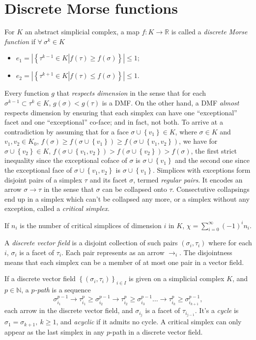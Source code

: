 \documentclass[a4paper,11pt, tikz]{article}
\newcommand{\lb}{\left(}
\newcommand{\rb}{\right)}
\newcommand{\lc}{\left\lbrace}
\newcommand{\rc}{\right\rbrace}
\newcommand{\lab}{\left|}
\newcommand{\rab}{\right|}
\renewcommand{\mid}{\left|\right.}
\newcommand{\reals}{\mathbb{R}}
\newcommand{\naturals}{\mathbb{N}}
\renewcommand{\t}{\tau}
\newcommand{\s}{\sigma}
\newcommand{\x}{\chi}
\newcommand{\tends}{\rightarrow}
\begin{document}
\section{Discrete Morse functions}
\noindent{}For $K$ an abstract simplicial complex, a map $f:K\tends \reals$ is called a \emph{discrete Morse function} if $\forall~\s^k\in K$
\begin{itemize}
  \item[(i)]$e_1=\lab\lc\t^{k-1}\in K\mid f\lb \tau\rb\geq f\lb \s\rb\rc\rab\leq 1$;
  \item[(ii)]$e_2=\lab\lc\t^{k+1}\in K\mid f\lb \tau\rb\leq f\lb \s\rb\rc\rab\leq 1$.
\end{itemize}
Every function $g$ that \emph{respects dimension} in the sense that for each $\s^{k-1}\subset \t^k\in K$, $g\lb \s\rb<g\lb \t\rb$ is a DMF. On the other hand, a DMF \emph{almost} respects dimension by ensuring that each simplex can have one ``exceptional'' facet and one ``exceptional'' co-face; and in fact, not both. To arrive at a contradiction by assuming that for a face $\s\cup\lc v_1\rc\in K$, where $\s\in K$ and $v_1,v_2\in K_0$, $f\lb \s\rb\geq f\lb \s\cup\lc v_1\rc\rb\geq f\lb \s\cup \lc v_1, v_2\rc\rb$, we have for $\s\cup\lc v_2\rc\in K$, $f\lb \s\cup \lc v_1, v_2\rc\rb>f\lb \s\cup \lc v_2\rc\rb>f\lb\s\rb$, the first strict inequality since the exceptional coface of $\s$ is $\s\cup\lc v_1\rc$ and the second one since the exceptional face of $\s\cup\lc v_1,v_2\rc$ is $\s\cup\lc v_1\rc$. Simplices with exceptions form disjoint pairs of a simplex $\t$ and its facet $\s$, termed \emph{regular pairs}. It encodes an arrow $\s\tends \t$ in the sense that $\s$ can be collapsed onto $\t$. Consectutive collapsings end up in a simplex which can't be collapsed any more, or a simplex without any exception, called a \emph{critical simplex}.

If $n_i$ is the number of critical simplices of dimension $i$ in $K$, $\x=\displaystyle\sum_{i=0}^\infty \lb -1\rb^in_i$.

A \emph{discrete vector field} is a disjoint collection of such pairs $\lb \s_i, \t_i\rb$ where for each $i$, $\s_i$ is a facet of $\t_i$. Each pair represents as an arrow $\tends_i$. The disjointness means that each simplex can be a member of at most one pair in a vector field.

If a discrete vector field $\lc\lb\s_i, \t_i\rb\rc_{i\in I}$ is given on a simplicial complex $K$, and $p\in\naturals$, a \emph{$p$-path} is a sequence
$$\s_{i_1}^{p-1}\tends \t_{i_1}^p\geq \s_{i_2}^{p-1}\tends \t_{i_2}^p\geq\s_{i_3}^{p-1}\dots\tends\t_{i_k}^p\geq \s_{i_{k+1}}^{p-1},$$
each arrow in the discrete vector field, and $\s_{i_j}$ is a facet of $\t_{i_{j-1}}$. It's a \emph{cycle} is $\s_1=\s_{k+1},~k\geq 1$, and \emph{acyclic} if it admits no cycle. A critical simplex can only appear as the last simplex in any $p$-path in a discrete vector field.
\end{document}
